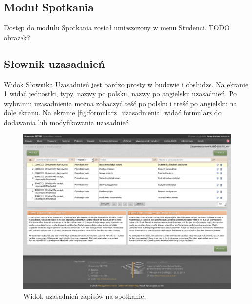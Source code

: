 \documentclass[licencjacka]{pracamgr}
\begin{document}
\subsection{Moduł Spotkania}
Dostęp do modułu Spotkania został umieszczony w menu Studenci. TODO obrazek?

\subsection{Słownik uzasadnień}
Widok Słownika Uzasadnień jest bardzo prosty w budowie i obsłudze. Na ekranie \ref{fig:uzasadnienia} widać jednostki, typy, nazwy po polsku, nazwy po angielsku uzasadnień. Po wybraniu uzasadnienia można zobaczyć teść po polsku i treść po angielsku na dole ekranu.
Na ekranie \ref{fig:formularz_uzasadnienia} widać formularz do dodawania lub modyfikowania uzasadnień.

\begin{figure}[!]
  \includegraphics[width=\linewidth]{widok_uzasadnien.jpg}
  \caption{Widok uzasadnień zapisów na spotkanie.}
  \label{fig:uzasadnienia}
\end{figure}
\end{document}
